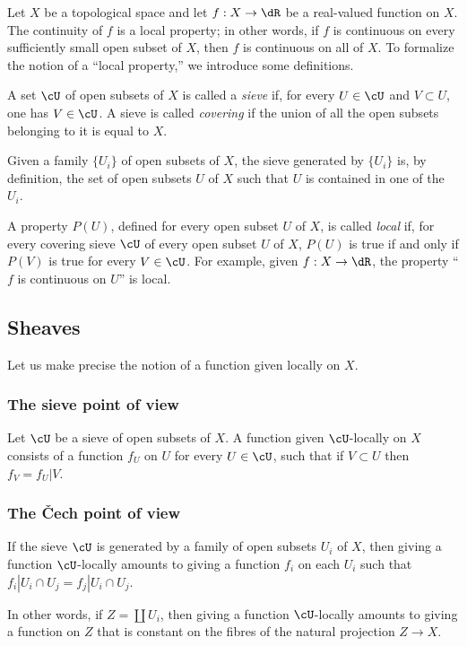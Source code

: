 Let $X$ be a topological space and let $f:X\to \dR$ be a real-valued
function on $X$. The continuity of $f$ is a local property; in other words,
if $f$ is continuous on every sufficiently small open subset of $X$, then
$f$ is continuous on all of $X$. To formalize the notion of a “local
property,” we introduce some definitions.

A set $\cU$ of open subsets of $X$ is called a \emph{sieve} if, for every
$U\in\cU$ and $V\subset U$, one has $V\in\cU$. A sieve is called
\emph{covering} if the union of all the open subsets belonging to it is
equal to $X$.

Given a family $\{U_i\}$ of open subsets of $X$, the sieve generated by
$\{U_i\}$ is, by definition, the set of open subsets $U$ of $X$ such that
$U$ is contained in one of the $U_i$.

A property $P(U)$, defined for every open subset $U$ of $X$, is called
\emph{local} if, for every covering sieve $\cU$ of every open subset $U$
of $X$, $P(U)$ is true if and only if $P(V)$ is true for every
$V\in \cU$. For example, given $f:X\to \dR$, the property “$f$ is
continuous on $U$” is local.

\subsection{Sheaves}\label{I:1-2}

Let us make precise the notion of a function given locally on $X$.

\subsubsection{The sieve point of view}\label{I:1-2-1}

Let $\cU$ be a sieve of open subsets of $X$. A function given
$\cU$-locally on $X$ consists of a function $f_U$ on $U$ for every
$U\in \cU$, such that if $V\subset U$ then $f_V=f_U|V$.

\subsubsection{The Čech point of view}\label{I:1-2-2}

If the sieve $\cU$ is generated by a family of open subsets $U_i$ of $X$,
then giving a function $\cU$-locally amounts to giving a function $f_i$
on each $U_i$ such that
$f_i|{U_i\cap U_j} = f_j|{U_i\cap U_j}$.

In other words, if $Z=\coprod U_i$, then giving a function
$\cU$-locally amounts to giving a function on $Z$ that is constant on the
fibres of the natural projection $Z\to X$.

